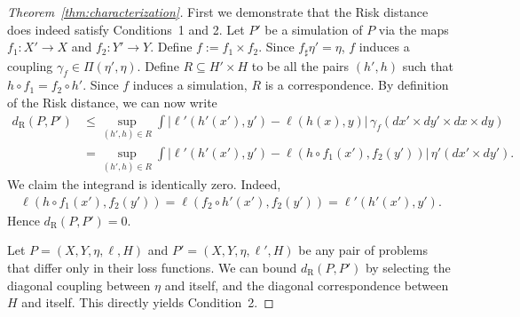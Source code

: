 \documentclass[twoside,11pt]{article}
\newcommand{\dexp}[1][]{d_{\mathrm{R}#1}}
\begin{document}
\begin{proof}[Theorem~\ref{thm:characterization}]
    First we demonstrate that the Risk distance does indeed satisfy Conditions~1 and 2. Let $P'$ be a simulation of $P$ via the maps $f_1:X' \to X$ and $f_2:Y'\to Y$. Define $f:= f_1\times f_2$. Since $f_\sharp \eta' = \eta$, $f$ induces a coupling $\gamma_f\in \Pi(\eta',\eta)$. Define $R\subseteq H'\times H$ to be all the pairs $(h',h)$ such that $h\circ f_1 = f_2\circ h'$. Since $f$ induces a simulation, $R$ is a correspondence. By definition of the Risk distance, we can now write
    \begin{align*}
        \dexp(P,P') & \leq 
        \sup_{(h',h)\in R}
        \int \big|
            \ell'(h'(x'),y') - \ell(h(x),y)
        \big|\, \gamma_f(dx' {\times} dy' {\times} dx {\times} dy)
        \\ & =
        \sup_{(h',h)\in R}
        \int \big|
            \ell'(h'(x'),y') - \ell(h\circ f_1(x'),f_2(y'))
        \big|\, \eta'(dx' {\times} dy').
    \end{align*}
    We claim the integrand is identically zero. Indeed,
    \begin{align*}
        \ell(h\circ f_1(x'),f_2(y')) = \ell(f_2\circ h'(x'),f_2(y')) = \ell'(h'(x'),y').
    \end{align*}
    Hence $\dexp(P,P') = 0$.

    Let $P = (X,Y,\eta,\ell,H)$ and $P' = (X,Y,\eta,\ell',H)$ be any pair of problems that differ only in their loss functions.
    We can bound $\dexp(P,P')$ by selecting the diagonal coupling between $\eta$ and itself, and the diagonal correspondence between $H$ and itself. This directly yields Condition~2.


\end{proof}
\end{document}

